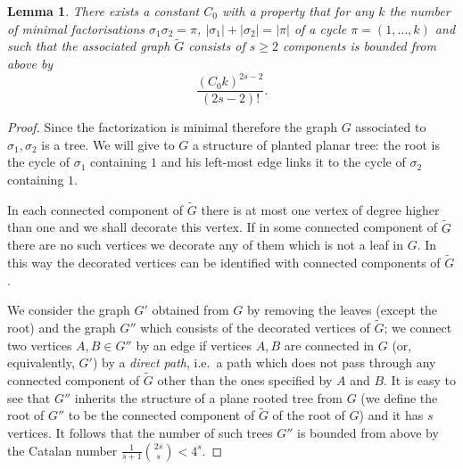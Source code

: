 \documentclass[12pt]{amsart}
\theoremstyle{plain}
\newtheorem{lemma}{Lemma}
\theoremstyle{remark}
\newcommand{\Grozciete}{\tilde{G}}
\newcommand{\Gobciete}{G'}
\newcommand{\GobcieteBardzo}{G''}
\begin{document}
\begin{lemma}
\label{lem:numer-of-cutted-graphs}
There exists a constant $C_0$ with a property that for any $k$
the number of minimal factorisations $\sigma_1\sigma_2=\pi$,
$|\sigma_1|+|\sigma_2|=|\pi|$ of a cycle $\pi=(1, \ldots ,k)$ and
such that the associated graph $\tilde{G}$
consists of $s\geq 2$ components is bounded from above by 
$$\frac{(C_0 k)^{2s-2}}{(2s-2)!}.$$
\end{lemma}
\begin{proof}
Since the factorization is minimal therefore the graph $G$ associated to
$\sigma_1,\sigma_2$ is a tree. We will give to $G$ a structure of planted planar
tree: the root
is the cycle of $\sigma_1$ containing $1$ and his left-most edge links it
to the cycle of $\sigma_2$ containing $1$.


In each connected component of $\Grozciete$ there is at most one vertex of
degree higher
than one and we shall decorate this vertex. If in some connected component of
$\Grozciete$ there are no such vertices we decorate any of them which is not a
leaf in $G$. In this way
the decorated vertices can be identified with connected components of
$\Grozciete$.




We consider the graph $\Gobciete$ obtained from $G$ by removing
the leaves (except the root) and the
graph $\GobcieteBardzo$ which consists of the decorated vertices of
$\Grozciete$; we connect two vertices $A,B\in\GobcieteBardzo$ by an edge if
vertices $A,B$ are connected in $G$ (or, equivalently, $\Gobciete$) by a
\emph{direct path}, i.e.\ a path which does not pass through any
connected component of $\tilde{G}$ other than the ones specified by $A$ and
$B$.
It is easy to see that $\GobcieteBardzo$ inherits the
structure of a plane rooted tree from $G$ (we define the root of
$\GobcieteBardzo$ to be the connected component of $\Grozciete$ of the root of
$G$) and it has $s$ vertices. It follows that the number of such trees
$\GobcieteBardzo$ is bounded from above by the Catalan number $\frac{1}{s+1}
\binom{2s}{s}<4^s$.


\end{proof}
\end{document}
